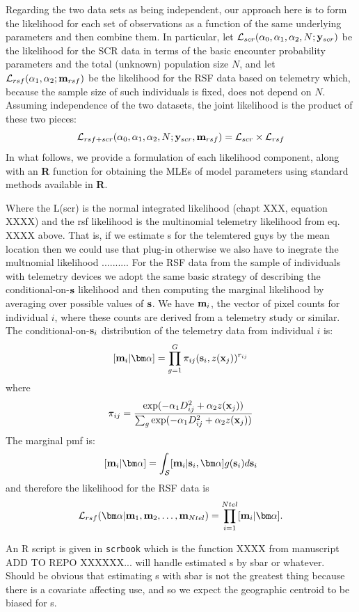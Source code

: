 Regarding the two data sets as being independent, our approach here
is to form the likelihood for each set of observations as a function
of the same underlying parameters and then combine them. In
particular, let ${\cal L}_{scr}(\alpha_{0}, \alpha_{1}, \alpha_{2}, N;
{\bf y}_{scr})$
be the likelihood for the SCR data in terms of the basic encounter
probability parameters and the total (unknown) population size $N$,
and let ${\cal L}_{rsf}(\alpha_{1},\alpha_{2}; {\bf m}_{rsf})$ be the
likelihood for the RSF data based on telemetry which, because the
sample size of such individuals is fixed, does not depend on $N$.
Assuming independence of the two datasets, the
joint likelihood is the product of these two pieces:
\[
{\cal L}_{rsf+scr}(\alpha_{0},\alpha_{1},\alpha_{2},N; {\bf y}_{scr},{\bf
  m}_{rsf})  = {\cal L}_{scr} \times {\cal L}_{rsf}
\]
In what follows, we provide a formulation of each likelihood
component, along with an {\bf R} function for obtaining the MLEs of
model parameters using standard methods available in {\bf R}.


Where the L(scr) is the normal integrated likelihood (chapt XXX,
equation XXXX) and the rsf likelihood is the multinomial telemetry
likelihood from eq. XXXX above. 
That is, if we estimate s for the telemtered guys by the mean location
then we could use that plug-in otherwise we also have to inegrate the
multnomial likelihood ..........
For the RSF data from the sample of individuals with telemetry devices
we adopt the same basic strategy of describing the
conditional-on-${\bf s}$ likelihood and then computing the marginal
likelihood by averaging over possible values of ${\bf s}$.
We have ${\bf m}_{i}$, the vector of pixel counts for individual $i$,
where these counts are derived from a telemetry study or similar.
The conditional-on-${\bf s}_{i}$ distribution of the telemetry data
from individual $i$ is:
\[
 [{\bf m}_{i}  | {\bm \alpha} ]
 = \prod_{g=1}^{G}  \pi_{ij}({\bf s}_{i},z({\bf x}_{j})) ^{r_{ij}}
\]
where
\[
 \pi_{ij}  = \frac{ \exp( -\alpha_{1} D_{ij}^{2} +\alpha_{2} z({\bf x}_{j}) ) }
{ \sum_{g} \exp(-\alpha_{1} D_{ij}^{2} +\alpha_{2} z({\bf x}_{j}))}
\]
The marginal pmf is:
\[
     [{\bf m}_{i}|{\bm \alpha}] =    \int_{{\cal S}}  [ {\bf m}_{i} |{\bf s}_{i},{\bm \alpha}] g({\bf s}_{i}) d{\bf s}_{i}
\]
and therefore the likelihood for the RSF data is
\[
{\cal L}_{rsf}({\bm \alpha} | {\bf m}_{1},{\bf m}_{2},\ldots, {\bf m}_{Ntel}) = \prod_{i=1}^{Ntel}
[{\bf m}_{i}|{\bm \alpha}].
\]

An R script is given in \mbox{\tt scrbook} which is the function XXXX
from manuscript ADD TO REPO XXXXXX... will handle estimated s by sbar
or whatever.   Should be obvious that estimating s with sbar is not
the greatest thing because there is a covariate affecting use, and so
we expect the geographic centroid to be biased for s.



